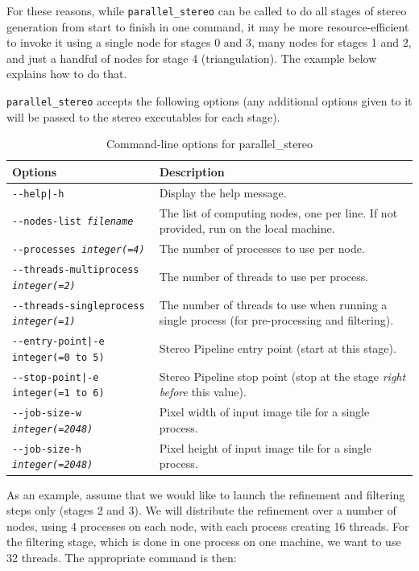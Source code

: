 For these reasons, while \texttt{parallel\_stereo} can be called to do
all stages of stereo generation from start to finish in one command, it
may be more resource-efficient to invoke it using a single node for
stages 0 and 3, many nodes for stages 1 and 2, and just a handful of
nodes for stage 4 (triangulation). The example below explains how to do
that.

\texttt{parallel\_stereo} accepts the following options (any additional
options given to it will be passed to the stereo executables
for each stage).

\begin{longtable}{|l|p{7.5cm}|}
\caption{Command-line options for parallel\_stereo}
\label{tbl:parallelstereo}
\endfirsthead
\endhead
\endfoot
\endlastfoot
\hline
Options & Description \\ \hline \hline
\texttt{-\/-help|-h} & Display the help message.\\ \hline
\texttt{-\/-nodes-list \textit{filename} } & The list of computing nodes,
one per line. If not provided, run on the local machine. \\ \hline
\texttt{-\/-processes \textit{integer(=4)}} & The number of processes to
use per node. \\ \hline
\texttt{-\/-threads-multiprocess \textit{integer(=2)}} & The number of threads to use per process.\\ \hline
\texttt{-\/-threads-singleprocess \textit{integer(=1)}} & The number of threads to use when running a single process (for pre-processing and filtering).\\ \hline
\texttt{-\/-entry-point|-e integer(=0 to 5)} & Stereo Pipeline entry
point (start at this stage). \\ \hline
\texttt{-\/-stop-point|-e integer(=1 to 6)} & Stereo Pipeline stop point
(stop at the stage {\it right before} this value). \\ \hline
\texttt{-\/-job-size-w \textit{integer(=2048)}} & Pixel width of input
image tile for a single process. \\ \hline
\texttt{-\/-job-size-h \textit{integer(=2048)}} & Pixel height of input
image tile for a single process. \\ \hline
\end{longtable}

As an example, assume that we would like to launch the refinement and
filtering steps only (stages 2 and 3). We will distribute the
refinement over a number of nodes, using 4 processes on each node, with
each process creating 16 threads. For the filtering stage, which is done
in one process on one machine, we want to use 32 threads. The
appropriate command is then:

